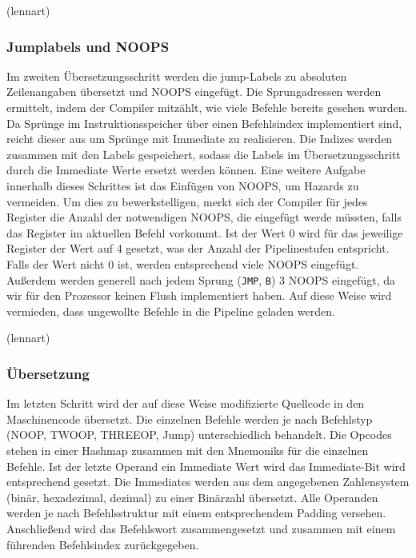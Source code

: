 \documentclass[paper=a4,fontsize=12pt,twocolumn]{scrreprt}
\begin{document}
(lennart)

\subsubsection{Jumplabels und NOOPS}
Im zweiten Übersetzungsschritt werden die jump-Labels zu absoluten Zeilenangaben übersetzt und NOOPS eingefügt.
Die Sprungadressen werden ermittelt, indem der Compiler mitzählt, wie viele Befehle bereits gesehen wurden.
Da Sprünge im Instruktionsspeicher über einen Befehlsindex implementiert sind, reicht dieser aus um Sprünge mit Immediate zu realisieren.
Die Indizes werden zusammen mit den Labels gespeichert, sodass die Labels im Übersetzungsschritt durch die Immediate Werte ersetzt werden können.
Eine weitere Aufgabe innerhalb dieses Schrittes ist das Einfügen von NOOPS, um Hazards zu vermeiden.
Um dies zu bewerkstelligen, merkt sich der Compiler für jedes Register die Anzahl der notwendigen NOOPS, die eingefügt werde müssten, falls das Register im aktuellen Befehl vorkommt.
Ist der Wert 0 wird für das jeweilige Register der Wert auf 4 gesetzt, was der Anzahl der Pipelinestufen entspricht.
Falls der Wert nicht 0 ist, werden entsprechend viele NOOPS eingefügt.
Außerdem werden generell nach jedem Sprung (\texttt{JMP}, \texttt{B}) 3 NOOPS eingefügt, da wir für den Prozessor keinen Flush implementiert haben.
Auf diese Weise wird vermieden, dass ungewollte Befehle in die Pipeline geladen werden.

(lennart)

\subsubsection{Übersetzung}
Im letzten Schritt wird der auf diese Weise modifizierte Quellcode in den Maschinencode übersetzt.
Die einzelnen Befehle werden je nach Befehlstyp (NOOP, TWOOP, THREEOP, Jump) unterschiedlich behandelt.
Die Opcodes stehen in einer Hashmap zusammen mit den Mnemoniks für die einzelnen Befehle.
Ist der letzte Operand ein Immediate Wert wird das Immediate-Bit wird entsprechend gesetzt.
Die Immediates werden aus dem angegebenen Zahlensystem (binär, hexadezimal, dezimal) zu einer Binärzahl übersetzt.
Alle Operanden werden je nach Befehlsstruktur mit einem entsprechendem Padding versehen.
Anschließend wird das Befehlswort zusammengesetzt und zusammen mit einem führenden Befehlsindex zurückgegeben.
\end{document}
